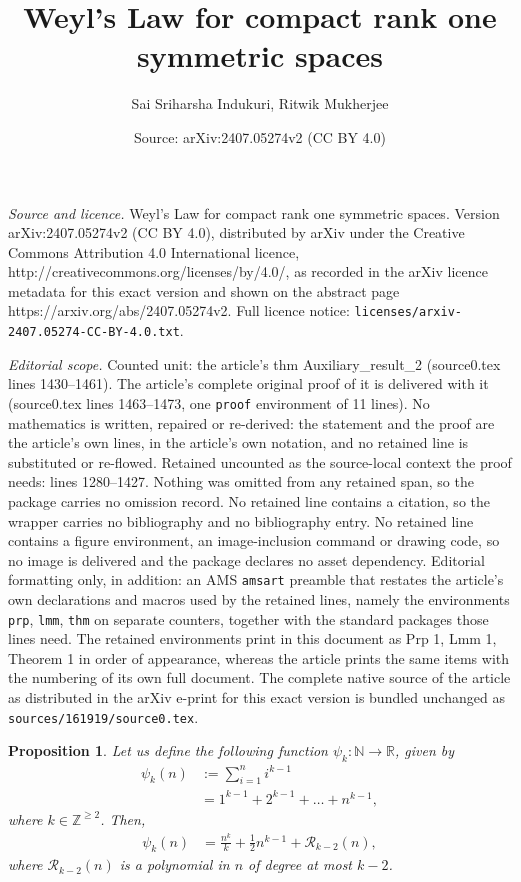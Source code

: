 \documentclass[10pt,a4paper]{amsart}
\title{Weyl's Law for compact rank one symmetric spaces}
\author{Sai Sriharsha Indukuri, Ritwik Mukherjee}
\date{Source: arXiv:2407.05274v2 (CC BY 4.0)}
\newtheorem{prp}{Proposition}
\begin{document}
\maketitle

\noindent\emph{Source and licence.} Weyl's Law for compact rank one symmetric spaces. Version arXiv:2407.05274v2 (CC BY 4.0), distributed by arXiv under the Creative Commons Attribution 4.0 International licence, http://creativecommons.org/licenses/by/4.0/, as recorded in the arXiv licence metadata for this exact version and shown on the abstract page https://arxiv.org/abs/2407.05274v2. Full licence notice: \texttt{licenses/arxiv-2407.05274-CC-BY-4.0.txt}.\par\smallskip

\noindent\textit{Editorial scope.} Counted unit: the article's thm Auxiliary\_result\_2 (source0.tex lines 1430--1461). The article's complete original proof of it is delivered with it (source0.tex lines 1463--1473, one \texttt{proof} environment of 11 lines). No mathematics is written, repaired or re-derived: the statement and the proof are the article's own lines, in the article's own notation, and no retained line is substituted or re-flowed.  Retained uncounted as the source-local context the proof needs: lines 1280--1427.  Nothing was omitted from any retained span, so the package carries no omission record.  No retained line contains a citation, so the wrapper carries no bibliography and no bibliography entry.  No retained line contains a figure environment, an image-inclusion command or drawing code, so no image is delivered and the package declares no asset dependency.  Editorial formatting only, in addition: an AMS \texttt{amsart} preamble that restates the article's own declarations and macros used by the retained lines, namely the environments \texttt{prp}, \texttt{lmm}, \texttt{thm} on separate counters, together with the standard packages those lines need.  The retained environments print in this document as Prp 1, Lmm 1, Theorem 1 in order of appearance, whereas the article prints the same items with the numbering of its own full document.  The complete native source of the article as distributed in the arXiv e-print for this exact version is bundled unchanged as \texttt{sources/161919/source0.tex}.
\begin{prp}
\label{psi_k}
Let us define the following function
$\psi_k: \mathbb{N}\longrightarrow \mathbb{R}$, given by   
\begin{align} 
\psi_k(n)&:= \sum_{i=1}^{n} i^{k-1} \nonumber \\ 
          & = 1^{k-1} + 2^{k-1} + \ldots + n^{k-1},   
\end{align} 
where $k \in \mathbb{Z}^{\geq 2}$. Then, 
\begin{align} 
\psi_k(n)& = \frac{n^k}{k} + \frac{1}{2} n^{k-1} + \mathcal{R}_{k-2}(n), \label{nk_error_sharp}
\end{align}
where $\mathcal{R}_{k-2}(n)$ is a polynomial in $n$ of degree at most $k-2$. 
\end{prp}
\end{document}
